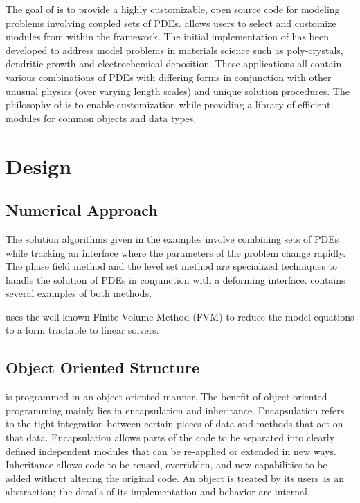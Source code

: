 The goal of \FiPy{} is to provide a highly customizable, open source
code for modeling problems involving coupled sets of PDEs.  \FiPy{}
allows users to select and customize modules from within the
framework.  The initial implementation of \FiPy{} has been developed
to address model problems in materials science such as poly-crystals,
dendritic growth and electrochemical deposition.  These applications
all contain various combinations of PDEs with differing forms in
conjunction with other unusual physics (over varying length scales)
and unique solution procedures.  The philosophy of \FiPy{} is to
enable customization while providing a library of efficient modules
for common objects and data types.

\section{Design}

\subsection{Numerical Approach}

The solution algorithms given in the \FiPy{} examples involve combining
sets of PDEs while tracking an interface where the parameters of the
problem change rapidly. The phase field method and the level set
method are specialized techniques to handle the solution of
PDEs in conjunction with a deforming interface. \FiPy{} contains
several examples of both methods.

\FiPy{} uses the well-known Finite Volume Method (FVM) to reduce the
model equations to a form tractable to linear solvers.

\subsection{Object Oriented Structure}

\FiPy{} is programmed in an object-oriented manner.  The benefit of
object oriented programming mainly lies in encapsulation and
inheritance.  Encapsulation refers to the tight integration between
certain pieces of data and methods that act on that data.
Encapsulation allows parts of the code to be separated into clearly
defined independent modules that can be re-applied or extended in new
ways.  Inheritance allows code to be reused, overridden, and new
capabilities to be added without altering the original code. An object
is treated by its users as an abstraction; the details of its
implementation and behavior are internal.

